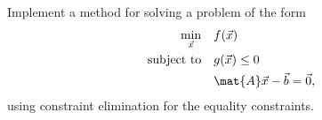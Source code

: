 %


\begin{exercise}[subtitle={Notebook}]
Implement a method for solving a problem of the form
\begin{align*}
\min_{\vec{x}} \quad & f(\vec{x})\\
\text{subject to} \quad & g(\vec{x}) \leq 0\\
& \mat{A}\vec{x} - \vec{b} = \vec{0},
\end{align*}
using constraint elimination for the equality constraints.
\end{exercise}



